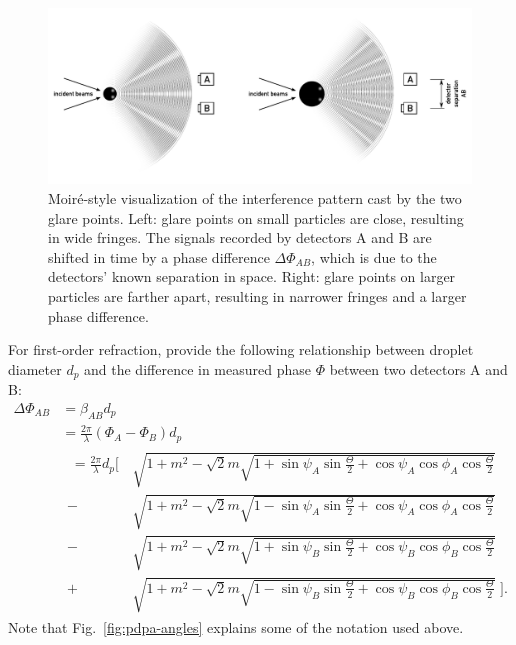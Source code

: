 \documentclass[11.5pt,oneside]{book}
\newcommand*{\figref}[1]{Fig.~\ref{#1}}
\begin{document}
\begin{figure}
    \centering
    \includegraphics[width=\textwidth]{img/setup/pdpa_moire_static.pdf}
    \caption{Moiré-style visualization of the interference pattern cast by the
    two glare points. Left: glare points on small particles are close, resulting
in wide fringes. The signals recorded by detectors A and B are shifted in time
by a phase difference $\Delta \Phi_{AB}$, which is due to the detectors' known
separation in space. Right: glare points on larger particles are farther apart,
resulting in narrower fringes and a larger phase difference.
\label{fig:pdpa-moire-static}}
\end{figure}

For first-order refraction, \citet{Albrecht03} provide the following
relationship between droplet diameter $d_p$ and the difference in measured
phase $\Phi$ between two detectors A and B:
\begin{equation}
    \begin{split}
        \Delta \Phi_{AB} &= \beta_{AB} d_p \\
                         &= \frac{2\pi}{\lambda} \left(\Phi_A - \Phi_B\right) d_p \\  
                         & 
        \begin{split}
            \;=\frac{2\pi}{\lambda} d_p \Bigg[\,&\sqrt{1+m^2-\sqrt{2} m
        \sqrt{1+\sin \psi_A \sin \frac{\Theta}{2} + \cos \psi_A \cos \phi_A \cos
    \frac{\Theta}{2}}} \\
        -{} &\sqrt{1+m^2-\sqrt{2} m \sqrt{1-\sin \psi_A \sin \frac{\Theta}{2} + \cos \psi_A \cos \phi_A \cos
    \frac{\Theta}{2}}}\\
        -{}&\sqrt{1+m^2-\sqrt{2} m \sqrt{1+\sin \psi_B \sin \frac{\Theta}{2} + \cos \psi_B \cos \phi_B \cos
    \frac{\Theta}{2}}}\\
    +{}&\sqrt{1+m^2-\sqrt{2} m \sqrt{1-\sin \psi_B \sin \frac{\Theta}{2} + \cos \psi_B \cos \phi_B \cos
    \frac{\Theta}{2}}}\; \Bigg]. \label{eq:pdpa-full}
\end{split}
    \end{split}
\end{equation}
Note that \figref{fig:pdpa-angles} explains some of the notation used above.
\end{document}
